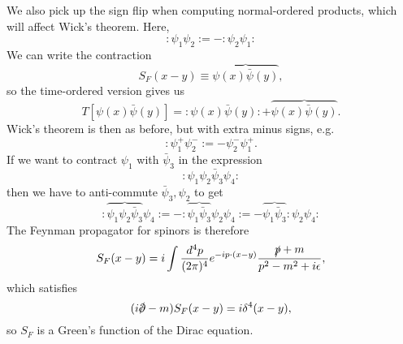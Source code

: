 We also pick up the sign flip when computing normal-ordered products, which will affect Wick's theorem. Here,
$$:\psi_1 \psi_2:=-:\psi_2 \psi_1:$$
We can write the contraction
$$S_F(x-y)\equiv \overbrace{\psi(x)\bar \psi(y)},$$
so the time-ordered version gives us
$$T[\psi(x)\bar \psi(y)]=:\psi(x)\bar \psi(y): +\overbrace{\psi(x)\bar \psi(y)}.$$
Wick's theorem is then as before, but with extra minus signs, e.g.
$$:\psi_1^+ \psi_2^-:=-\psi_2^- \psi_1^+.$$ If we want to contract $\psi_1$ with $\bar \psi_3$ in the expression
$$:\psi_1 \psi_2 \bar \psi_3 \psi_4:$$
then we have to anti-commute $\bar \psi_3,\psi_2$ to get
$$:\overbrace{\psi_1 \psi_2 \bar \psi_3} \psi_4:=-:\overbrace{\psi_1 \bar \psi_3}\psi_2 \psi_4:=-\overbrace{\psi_1\bar \psi_3} :\psi_2 \psi_4:$$
The Feynman propagator for spinors is therefore
$$S_F(x-y)=i\int \frac{d^4p}{(2\pi)^4} e^{-ip\cdot (x-y)} \frac{\slashed{p}+m}{p^2-m^2+i\epsilon},$$
which satisfies
$$(i\slashed{\p}-m)S_F(x-y)=i\delta^4(x-y),$$
so $S_F$ is a Green's function of the Dirac equation.